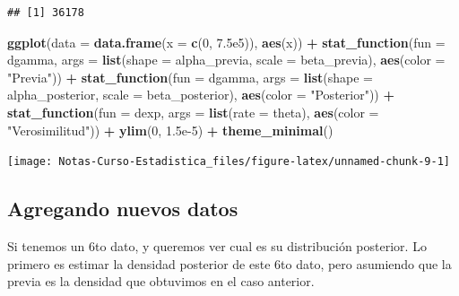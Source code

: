 \documentclass[
  12pt,
]{book}
\newenvironment{Shaded}{\begin{snugshade}}{\end{snugshade}}
\newcommand{\DataTypeTok}[1]{\textcolor[rgb]{0.13,0.29,0.53}{#1}}
\newcommand{\DecValTok}[1]{\textcolor[rgb]{0.00,0.00,0.81}{#1}}
\newcommand{\FloatTok}[1]{\textcolor[rgb]{0.00,0.00,0.81}{#1}}
\newcommand{\KeywordTok}[1]{\textcolor[rgb]{0.13,0.29,0.53}{\textbf{#1}}}
\newcommand{\NormalTok}[1]{#1}
\newcommand{\OperatorTok}[1]{\textcolor[rgb]{0.81,0.36,0.00}{\textbf{#1}}}
\newcommand{\StringTok}[1]{\textcolor[rgb]{0.31,0.60,0.02}{#1}}
\begin{document}
\begin{verbatim}
## [1] 36178
\end{verbatim}

\begin{Shaded}
\begin{Highlighting}[]
\KeywordTok{ggplot}\NormalTok{(}\DataTypeTok{data =} \KeywordTok{data.frame}\NormalTok{(}\DataTypeTok{x =} \KeywordTok{c}\NormalTok{(}\DecValTok{0}\NormalTok{, }\FloatTok{7.5e5}\NormalTok{)), }\KeywordTok{aes}\NormalTok{(x)) }\OperatorTok{+}
\StringTok{  }\KeywordTok{stat\_function}\NormalTok{(}\DataTypeTok{fun =}\NormalTok{ dgamma, }\DataTypeTok{args =} \KeywordTok{list}\NormalTok{(}\DataTypeTok{shape =}\NormalTok{ alpha\_previa, }\DataTypeTok{scale =}\NormalTok{ beta\_previa), }\KeywordTok{aes}\NormalTok{(}\DataTypeTok{color =} \StringTok{"Previa"}\NormalTok{)) }\OperatorTok{+}
\StringTok{  }\KeywordTok{stat\_function}\NormalTok{(}\DataTypeTok{fun =}\NormalTok{ dgamma, }\DataTypeTok{args =} \KeywordTok{list}\NormalTok{(}\DataTypeTok{shape =}\NormalTok{ alpha\_posterior, }\DataTypeTok{scale =}\NormalTok{ beta\_posterior), }\KeywordTok{aes}\NormalTok{(}\DataTypeTok{color =} \StringTok{"Posterior"}\NormalTok{)) }\OperatorTok{+}
\StringTok{  }\KeywordTok{stat\_function}\NormalTok{(}\DataTypeTok{fun =}\NormalTok{ dexp, }\DataTypeTok{args =} \KeywordTok{list}\NormalTok{(}\DataTypeTok{rate =}\NormalTok{ theta), }\KeywordTok{aes}\NormalTok{(}\DataTypeTok{color =} \StringTok{"Verosimilitud"}\NormalTok{)) }\OperatorTok{+}
\StringTok{  }\KeywordTok{ylim}\NormalTok{(}\DecValTok{0}\NormalTok{, }\FloatTok{1.5e{-}5}\NormalTok{) }\OperatorTok{+}
\StringTok{  }\KeywordTok{theme\_minimal}\NormalTok{()}
\end{Highlighting}
\end{Shaded}

\begin{center}\texttt{[image: Notas-Curso-Estadistica\_files/figure-latex/unnamed-chunk-9-1]} \end{center}

\hypertarget{agregando-nuevos-datos}{%
\subsection{Agregando nuevos datos}\label{agregando-nuevos-datos}}

Si tenemos un 6to dato, y queremos ver cual es su distribución posterior. Lo primero es estimar la densidad posterior de este 6to dato, pero asumiendo que la previa es la densidad que obtuvimos en el caso anterior.
\end{document}

